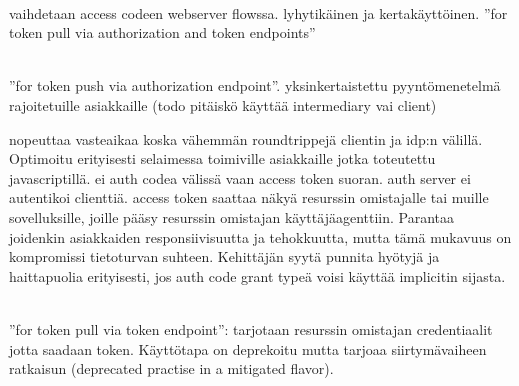 \documentclass[finnish,gradu]{tktltiki}
\begin{document}
  \begin{description}
    \item

  \item[Authorization code:] \hfill \\
   vaihdetaan access codeen webserver flowssa. lyhytikäinen ja kertakäyttöinen.
   ''for token pull via authorization and token endpoints''

  \item[Implicit flow:] \hfill \\
  ''for token push via authorization endpoint''. yksinkertaistettu pyyntömenetelmä rajoitetuille asiakkaille (todo pitäiskö käyttää intermediary vai client)

   nopeuttaa vasteaikaa koska vähemmän roundtrippejä clientin ja idp:n välillä. Optimoitu erityisesti selaimessa toimiville asiakkaille jotka toteutettu javascriptillä. ei auth codea välissä vaan access token suoran. auth server ei autentikoi clienttiä. access token saattaa näkyä resurssin omistajalle tai muille sovelluksille, joille pääsy resurssin omistajan käyttäjäagenttiin. Parantaa joidenkin asiakkaiden responsiivisuutta ja tehokkuutta, mutta tämä mukavuus on kompromissi tietoturvan suhteen. Kehittäjän syytä punnita hyötyjä ja haittapuolia erityisesti, jos auth code grant typeä voisi käyttää implicitin sijasta.

   \item[Resource owner password credentials:] \hfill \\
   ''for token pull via token endpoint'': tarjotaan resurssin omistajan credentiaalit jotta saadaan token. Käyttötapa on deprekoitu mutta tarjoaa siirtymävaiheen ratkaisun (deprecated practise in a mitigated flavor).


\end{description}
\end{document}
